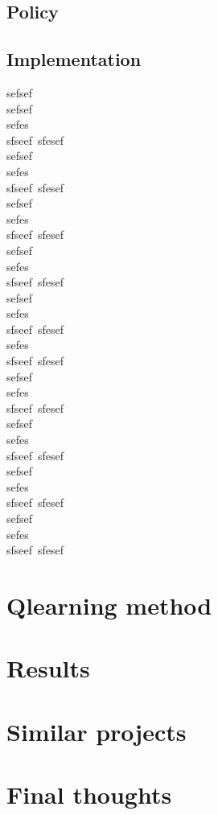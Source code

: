 \documentclass[twoside,twocolumn]{article}
\begin{document}
\subsection*{Policy}
\subsection*{Implementation}


sefsef\\
sefsef\\
sefes\\
sfseef\
sfesef\\
sefsef\\
sefes\\
sfseef\
sfesef\\
sefsef\\
sefes\\
sfseef\
sfesef\\
sefsef\\
sefes\\
sfseef\
sfesef\\
sefsef\\
sefes\\
sfseef\
sfesef\\
sefes\\
sfseef\
sfesef\\
sefsef\\
sefes\\
sfseef\
sfesef\\
sefsef\\
sefes\\
sfseef\
sfesef\\
sefsef\\
sefes\\
sfseef\
sfesef\\
sefsef\\
sefes\\
sfseef\
sfesef\\
\section{Qlearning method}
\section{Results}
\section{Similar projects}
\section{Final thoughts}
\end{document}
